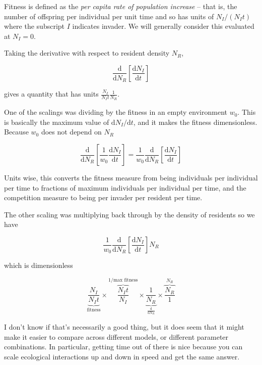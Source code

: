 \documentclass[12pt,a4paper]{article}
\newcommand{\ud}{\ensuremath{\mathrm{d}}}
\begin{document}
Fitness is defined as the \emph{per capita rate of population
  increase} -- that is, the number of offspring per individual per
unit time and so has units of $N_I / (N_I t)$ where the subscript $I$
indicates invader.  We will generally consider this evaluated at $N_I
= 0$.

Taking the derivative with respect to resident density $N_R$,

\begin{equation*}
  \frac{\ud}{\ud N_R}\left[ \frac{\ud N_I}{\ud t} \right]
\end{equation*}

gives a quantity that has units $\frac{N_I}{N_I t}\frac{1}{N_R}$.

One of the scalings was dividing by the fitness in an empty
environment $w_0$.  This is basically the maximum value of $\ud N_I/
\ud t$, and it makes the fitness dimensionless.  Because $w_0$ does
not depend on $N_R$

\begin{equation*}
  \frac{\ud}{\ud N_R} \left[\frac{1}{w_0}\frac{\ud N_I}{\ud t}\right]
  =
  \frac{1}{w_0}\frac{\ud}{\ud N_R}\left[\frac{\ud N_I}{\ud t}\right]
\end{equation*}

Units wise, this converts the fitness measure from being individuals
per individual per time to fractions of maximum individuals per
individual per time, and the competition measure to being per invader
per resident per time.

The other scaling was multiplying back through by the density of
residents so we have

\begin{equation*}
  \frac{1}{w_0}\frac{\ud}{\ud N_R}\left[\frac{\ud N_I}{\ud t}\right] N_R
\end{equation*}

which is dimensionless

\begin{equation*}
  \underbrace{\frac{N_I}{N_I t}}_{\text{fitness}}
  \times
  \overbrace{\frac{N_I t}{N_I}}^{1/\text{max fitness}}
  \times
  \underbrace{\frac{1}{N_R}}_{\frac{\ud}{\ud N_R}}
  \times
  \overbrace{\frac{N_R}{1}}^{N_R}
\end{equation*}

I don't know if that's necessarily a good thing, but it does seem that
it might make it easier to compare across different models, or
different parameter combinations.  In particular, getting time out of
there is nice because you can scale ecological interactions up and
down in speed and get the same answer.
\end{document}
